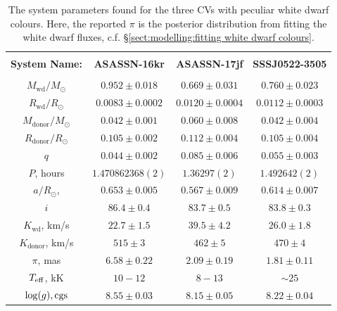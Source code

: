 \begin{table}
    \centering
    \caption{The system parameters found for the three CVs with peculiar white dwarf colours. Here, the reported $\pi$ is the posterior distribution from fitting the white dwarf fluxes, c.f. \S\ref{sect:modelling:fitting white dwarf colours}.}
    \label{table:three white dwarfs:system_parameters main}
    \begin{tabular}{cccc}
        \hline \\
        \textbf{System Name:}      & \textbf{ASASSN-16kr}    & \textbf{ASASSN-17jf}  & \textbf{SSSJ0522-3505} \\
        \hline \hline \\
        $M_\mathrm{wd}/M_\odot$    & $0.952\pm0.018$         & $0.669\pm0.031$        & $0.760\pm0.023$ \\
        $R_\mathrm{wd}/R_\odot$    & $0.0083\pm0.0002$       & $0.0120\pm0.0004$      & $0.0112\pm0.0003$ \\
        $M_\mathrm{donor}/M_\odot$ & $0.042\pm0.001$         & $0.060\pm0.008$        & $0.042\pm0.004$ \\
        $R_\mathrm{donor}/R_\odot$ & $0.105\pm0.002$         & $0.112\pm0.004$        & $0.105\pm0.004$ \\
        $q$                        & $0.044\pm0.002$         & $0.085\pm0.006$        & $0.055\pm0.003$ \\
        \hline
        $P$, hours                 & $1.470862368(2)$        & $1.36297(2)$           & $1.492642(2)$ \\
        $a/R_\odot$,               & $0.653\pm0.005$         & $0.567\pm0.009$        & $0.614\pm0.007$  \\
        $i$                        & $86.4\pm0.4$            & $83.7\pm0.5$           & $83.8\pm0.3$  \\
        $K_\mathrm{wd}$, km/s      & $22.7\pm1.5$            & $39.5\pm4.2$           & $26.0\pm1.8$  \\
        $K_\mathrm{donor}$, km/s   & $515\pm3$               & $462\pm5$              & $470\pm4$  \\
        \hline
        $\pi$, mas                 & $6.58\pm0.22$           & $2.09\pm0.19$          & $1.81\pm0.11$  \\
        $T_{\rm eff}$, kK          & $10-12$                 & $8-13$                 & $\sim25$  \\
        $\log(g), {\rm cgs}$       & $8.55\pm0.03$           & $8.15\pm0.05$          & $8.22\pm0.04$  \\
        \hline
    \end{tabular}
\end{table}


